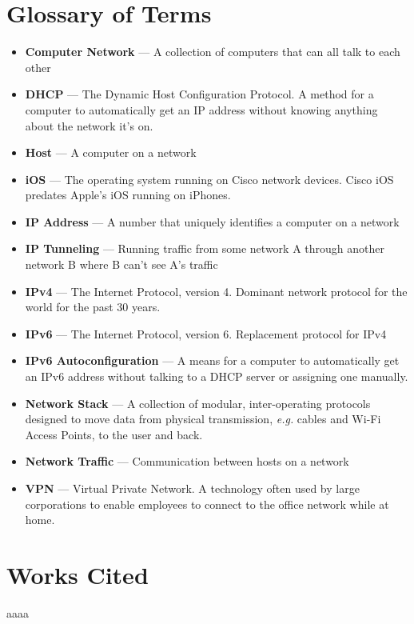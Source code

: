 \documentclass[12pt]{article}
\begin{document}
\section{Glossary of Terms}

\begin{itemize}
\item[] \textbf{Computer Network} --- A collection of computers that can all talk to each other
\item[] \textbf{DHCP} --- The Dynamic Host Configuration Protocol. A method for a computer to automatically get an IP address without knowing anything about the network it's on.
\item[] \textbf{Host} --- A computer on a network
\item[] \textbf{iOS} --- The operating system running on Cisco network devices. Cisco iOS predates Apple's iOS running on iPhones.
\item[] \textbf{IP Address} --- A number that uniquely identifies a computer on a network
\item[] \textbf{IP Tunneling} --- Running traffic from some network A  through another network B where B can't see A's traffic
\item[] \textbf{IPv4} --- The Internet Protocol, version 4. Dominant network protocol for the world for the past 30 years.
\item[] \textbf{IPv6} --- The Internet Protocol, version 6. Replacement protocol for IPv4
\item[] \textbf{IPv6 Autoconfiguration} --- A means for a computer to automatically get an IPv6 address without talking to a DHCP server or assigning one manually.
\item[] \textbf{Network Stack} --- A collection of modular, inter-operating protocols designed to move data from physical transmission, \textit{e.g.} cables and Wi-Fi Access Points, to the user and back.
\item[] \textbf{Network Traffic} --- Communication between hosts on a network
\item[] \textbf{VPN} --- Virtual Private Network. A technology often used by large corporations to enable employees to connect to the office network while at home.
\end{itemize}

\section{Works Cited}
aaaa
\end{document}
